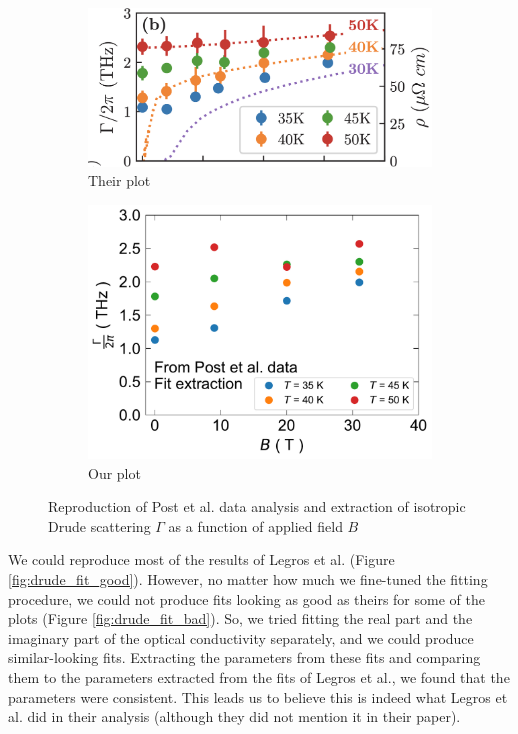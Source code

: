 \begin{figure}
\centering
\begin{subfigure}{0.45\textwidth}
    \includegraphics[width=\textwidth]{figures/gamma_theirs}
    \caption{Their plot}
    \label{fig:gamma_ours}
\end{subfigure}
\hfill
\begin{subfigure}{0.45\textwidth}
    \includegraphics[width=\textwidth]{figures/fitting_Drude_extracted_Gamma.pdf}
    \caption{Our plot}
    \label{fig:gamma_theirs}
\end{subfigure}
        
\caption{Reproduction of Post et al. data analysis and extraction of isotropic Drude scattering $\Gamma$ as a function of applied field $B$}
\label{fig:reproduction_post}
\end{figure}

We could reproduce most of the results of Legros et al. (Figure \ref{fig:drude_fit_good}).
However, no matter how much we fine-tuned the fitting procedure, we could not produce fits looking
as good as theirs for some of the plots (Figure \ref{fig:drude_fit_bad}). So, we tried fitting the
real part and the imaginary part of the optical conductivity separately, and we could produce
similar-looking fits. Extracting the parameters from these fits and comparing them to the parameters
extracted from the fits of Legros et al., we found that the parameters were consistent. This leads
us to believe this is indeed what Legros et al. did in their analysis (although they did not mention
it in their paper).

